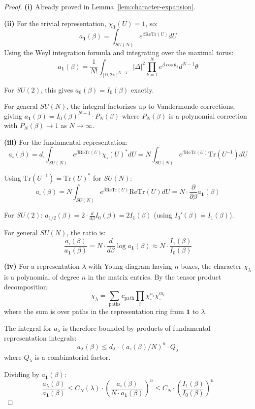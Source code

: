 \begin{proof}
\textbf{(i)} Already proved in Lemma~\ref{lem:character-expansion}.

\textbf{(ii)} For the trivial representation, $\chi_{\mathbf{1}}(U) = 1$, so:
\[
a_{\mathbf{1}}(\beta) = \int_{SU(N)} e^{\beta \text{Re}\text{Tr}(U)} dU
\]
Using the Weyl integration formula and integrating over the maximal torus:
\[
a_{\mathbf{1}}(\beta) = \frac{1}{N!} \int_{[0,2\pi]^{N-1}} |\Delta|^2 \prod_{k=1}^N e^{\beta \cos\theta_k} d^{N-1}\theta
\]

For $SU(2)$, this gives $a_0(\beta) = I_0(\beta)$ exactly.

For general $SU(N)$, the integral factorizes up to Vandermonde corrections, 
giving $a_{\mathbf{1}}(\beta) = I_0(\beta)^{N-1} \cdot P_N(\beta)$ where $P_N(\beta)$ 
is a polynomial correction with $P_N(\beta) \to 1$ as $N \to \infty$.

\textbf{(iii)} For the fundamental representation:
\[
a_{\square}(\beta) = d_\square \int_{SU(N)} e^{\beta \text{Re}\text{Tr}(U)} \chi_\square(U)^* dU 
= N \int_{SU(N)} e^{\beta \text{Re}\text{Tr}(U)} \text{Tr}(U^{-1}) dU
\]

Using $\text{Tr}(U^{-1}) = \text{Tr}(U)^*$ for $SU(N)$:
\[
a_{\square}(\beta) = N \int_{SU(N)} e^{\beta \text{Re}\text{Tr}(U)} \text{Re}\text{Tr}(U) dU 
= N \cdot \frac{\partial}{\partial \beta} a_{\mathbf{1}}(\beta)
\]

For $SU(2)$: $a_{1/2}(\beta) = 2 \cdot \frac{d}{d\beta} I_0(\beta) = 2 I_1(\beta)$ 
(using $I_0'(\beta) = I_1(\beta)$).

For general $SU(N)$, the ratio is:
\[
\frac{a_{\square}(\beta)}{a_{\mathbf{1}}(\beta)} = N \cdot \frac{d}{d\beta} \log a_{\mathbf{1}}(\beta) 
\approx N \cdot \frac{I_1(\beta)}{I_0(\beta)}
\]

\textbf{(iv)} For a representation $\lambda$ with Young diagram having $n$ boxes, 
the character $\chi_\lambda$ is a polynomial of degree $n$ in the matrix entries.
By the tensor product decomposition:
\[
\chi_\lambda = \sum_{\text{paths}} c_{\text{path}} \prod_{i} \chi_{\square}^{n_i} \chi_{\overline{\square}}^{m_i}
\]
where the sum is over paths in the representation ring from $\mathbf{1}$ to $\lambda$.

The integral for $a_\lambda$ is therefore bounded by products of fundamental 
representation integrals:
\[
a_\lambda(\beta) \leq d_\lambda \cdot (a_{\square}(\beta)/N)^n \cdot Q_\lambda
\]
where $Q_\lambda$ is a combinatorial factor.

Dividing by $a_{\mathbf{1}}(\beta)$:
\[
\frac{a_\lambda(\beta)}{a_{\mathbf{1}}(\beta)} \leq C_N(\lambda) \cdot \left(\frac{a_{\square}(\beta)}{N \cdot a_{\mathbf{1}}(\beta)}\right)^n 
\leq C_N \cdot \left(\frac{I_1(\beta)}{I_0(\beta)}\right)^n
\]


\end{proof}
